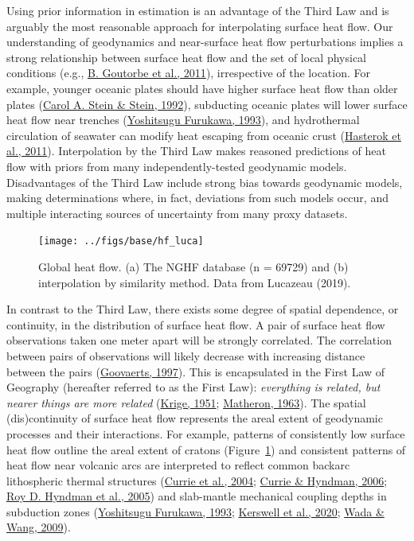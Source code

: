 \documentclass[draft,linenumbers]{agujournal2018}
\begin{document}
Using prior information in estimation is an advantage of the Third Law
and is arguably the most reasonable approach for interpolating surface
heat flow. Our understanding of geodynamics and near-surface heat flow
perturbations implies a strong relationship between surface heat flow
and the set of local physical conditions (e.g.,
\protect\hyperlink{ref-goutorbe2011}{B. Goutorbe et al., 2011}),
irrespective of the location. For example, younger oceanic plates should
have higher surface heat flow than older plates
(\protect\hyperlink{ref-stein1992}{Carol A. Stein \& Stein, 1992}),
subducting oceanic plates will lower surface heat flow near trenches
(\protect\hyperlink{ref-furukawa1993}{Yoshitsugu Furukawa, 1993}), and
hydrothermal circulation of seawater can modify heat escaping from
oceanic crust (\protect\hyperlink{ref-hasterok2011}{Hasterok et al.,
2011}). Interpolation by the Third Law makes reasoned predictions of
heat flow with priors from many independently-tested geodynamic models.
Disadvantages of the Third Law include strong bias towards geodynamic
models, making determinations where, in fact, deviations from such
models occur, and multiple interacting sources of uncertainty from many
proxy datasets.

\begin{figure}[h]

{\centering \texttt{[image: ../figs/base/hf\_luca]} 

}

\caption{Global heat flow. (a) The NGHF database (n = 69729) and (b) interpolation by similarity method. Data from Lucazeau (2019).}\label{fig:lucahf}
\end{figure}

In contrast to the Third Law, there exists some degree of spatial
dependence, or continuity, in the distribution of surface heat flow. A
pair of surface heat flow observations taken one meter apart will be
strongly correlated. The correlation between pairs of observations will
likely decrease with increasing distance between the pairs
(\protect\hyperlink{ref-goovaerts1997}{Goovaerts, 1997}). This is
encapsulated in the First Law of Geography (hereafter referred to as the
First Law): \emph{everything is related, but nearer things are more
related} (\protect\hyperlink{ref-krige1951}{Krige, 1951};
\protect\hyperlink{ref-matheron1963}{Matheron, 1963}). The spatial
(dis)continuity of surface heat flow represents the areal extent of
geodynamic processes and their interactions. For example, patterns of
consistently low surface heat flow outline the areal extent of cratons
(Figure~\ref{fig:lucahf}) and consistent patterns of heat flow near
volcanic arcs are interpreted to reflect common backarc lithospheric
thermal structures (\protect\hyperlink{ref-currie2004}{Currie et al.,
2004}; \protect\hyperlink{ref-currie2006}{Currie \& Hyndman, 2006};
\protect\hyperlink{ref-hyndman2005}{Roy D. Hyndman et al., 2005}) and
slab-mantle mechanical coupling depths in subduction zones
(\protect\hyperlink{ref-furukawa1993}{Yoshitsugu Furukawa, 1993};
\protect\hyperlink{ref-kerswell2020}{Kerswell et al., 2020};
\protect\hyperlink{ref-wada2009}{Wada \& Wang, 2009}).
\end{document}
